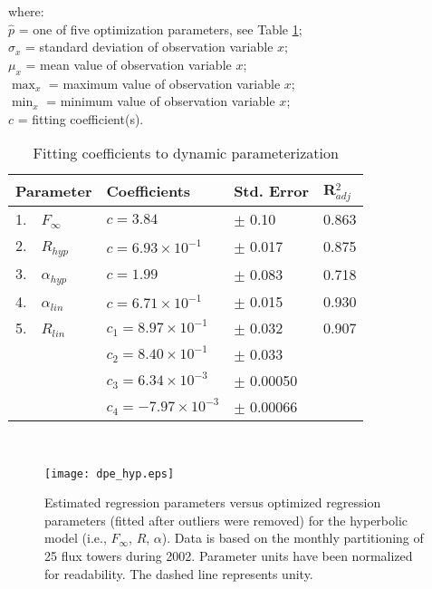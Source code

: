 \noindent where:\\
\indent $\hat{p}$ = one of five optimization parameters, 
                    see Table \ref{tab:dpe};\\
\indent $\sigma_{x}$ = standard deviation of observation variable $x$;\\
\indent $\mu_{x}$ = mean value of observation variable $x$;\\
\indent $\max_{x}$ = maximum value of observation variable $x$;\\
\indent $\min_{x}$ = minimum value of observation variable $x$;\\
\indent $c$ = fitting coefficient(s).\\
\begin{table}[h]
    \caption{Fitting coefficients to dynamic parameterization}
    \label{tab:dpe}
    \centering
    \begin{tabular}{l l l l}
    \hline
    \bf{Parameter} & \bf{Coefficients} & \bf{Std. Error} & \bf{R$_{adj}^{2}$}\\
    \hline
    1.~~$F_{\infty}$ & $c = 3.84$                & $\pm$ 0.10  & 0.863 \\
    2.~~$R_{hyp}$    & $c = 6.93 \times 10^{-1}$ & $\pm$ 0.017 & 0.875 \\
    3.~~$\alpha_{hyp}$ & $c = 1.99$                & $\pm$ 0.083 & 0.718 \\
    4.~~$\alpha_{lin}$ & $c = 6.71 \times 10^{-1}$ & $\pm$ 0.015 & 0.930 \\
    5.~~$R_{lin}$  & $c_{1} = 8.97 \times 10^{-1}$  & $\pm$ 0.032 & 0.907 \\
    ~              & $c_{2} = 8.40 \times 10^{-1}$  & $\pm$ 0.033 & ~ \\
    ~              & $c_{3} = 6.34 \times 10^{-3}$  & $\pm$ 0.00050 & ~ \\
    ~              & $c_{4} = -7.97 \times 10^{-3}$ & $\pm$ 0.00066 & ~ \\
    \hline
    \end{tabular}\\
\end{table}

\begin{figure}[h!]
    \texttt{[image: dpe\_hyp.eps]}
    \caption{Estimated regression parameters versus optimized regression 
    parameters (fitted after outliers were removed) for the hyperbolic model 
    (i.e., $F_{\infty}$, $R$, $\alpha$). Data is based on the monthly 
    partitioning of 25 flux towers during 2002. Parameter units have been 
    normalized for readability. The dashed line represents unity.}
    \label{fig:hmodest}
\end{figure}

